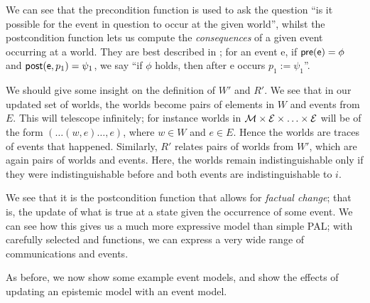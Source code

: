 \documentclass[10pt, a4paper]{report}
\begin{document}
We can see that the precondition function is used to ask the question ``is it
possible for the event in question to occur at the given world'', whilst the
postcondition function lets us compute the \emph{consequences} of a given event
occurring at a world. They are best described in \cite{Prisoners}; for an event
\textsf{e}, if $\textsf{pre}(\textsf{e}) = \phi$ and $\textsf{post}(\textsf{e}, p_1) = \psi_1$,
we say ``if $\phi$ holds, then after \textsf{e} occurs $p_1 := \psi_1$''.

We should give some insight on the definition of $W'$ and $R'$. We see that in
our updated set of worlds, the worlds become pairs of elements in $W$ and events
from $E$. This will telescope infinitely; for instance worlds in $\mathcal{M} \times
\mathcal{E} \times \ldots \times \mathcal{E}$ will be of the form $(\ldots (w ,e) \ldots, e)$, where
$w \in W$ and $e \in E$. Hence the worlds are traces of events that happened.
Similarly, $R'$ relates pairs of worlds from $W'$, which are again pairs of
worlds and events. Here, the worlds remain indistinguishable only if they were
indistinguishable before and both events are indistinguishable to $i$.

We see that it is the postcondition function that allows for \emph{factual
  change}; that is, the update of what is true at a state given the occurrence of
some event. We can see how this gives us a much more expressive model than
simple PAL; with carefully selected \tpre and \tpost functions, we can express a
very wide range of communications and events. 

As before, we now show some example event models, and show the effects of
updating an epistemic model with an event model.
\end{document}

